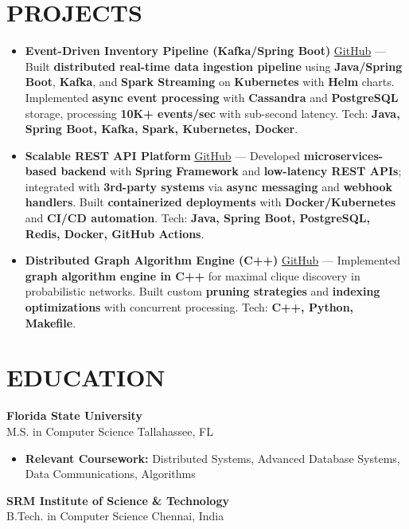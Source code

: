 \documentclass[letterpaper,10pt]{article}
\newcommand{\resumeItem}[1]{\item\small #1}
\newcommand{\resumeSubheading}[4]{
  \vspace{6pt}
  \noindent
  \textbf{#1} \hfill {\footnotesize #2} \\
  [-1pt]
  \noindent
  \small #3 \hfill {\small #4}
  \vspace{3pt}
}
\newcommand{\resumeItemsStart}{\vspace{-2pt}\begin{itemize}}
\newcommand{\resumeItemsEnd}{\end{itemize}\vspace{6pt}}
\begin{document}
\section{\textcolor{metablue}{PROJECTS}}
\vspace{-5pt}
\begin{tcolorbox}[colback=white,colframe=metablue,boxrule=0.8pt,arc=2pt,left=4pt,right=4pt,top=2pt,bottom=2pt]
\begin{itemize}
\resumeItem{\textbf{Event-Driven Inventory Pipeline (Kafka/Spring Boot)} \href{https://github.com/adityasugandhi}{GitHub} --- Built \textbf{distributed real-time data ingestion pipeline} using \textbf{Java/Spring Boot}, \textbf{Kafka}, and \textbf{Spark Streaming} on \textbf{Kubernetes} with \textbf{Helm} charts. Implemented \textbf{async event processing} with \textbf{Cassandra} and \textbf{PostgreSQL} storage, processing \textbf{10K+ events/sec} with sub-second latency. Tech: \textbf{Java, Spring Boot, Kafka, Spark, Kubernetes, Docker}.}
\resumeItem{\textbf{Scalable REST API Platform} \href{https://github.com/adityasugandhi}{GitHub} --- Developed \textbf{microservices-based backend} with \textbf{Spring Framework} and \textbf{low-latency REST APIs}; integrated with \textbf{3rd-party systems} via \textbf{async messaging} and \textbf{webhook handlers}. Built \textbf{containerized deployments} with \textbf{Docker/Kubernetes} and \textbf{CI/CD automation}. Tech: \textbf{Java, Spring Boot, PostgreSQL, Redis, Docker, GitHub Actions}.}
\resumeItem{\textbf{Distributed Graph Algorithm Engine (C++)} \href{https://github.com/adityasugandhi/Improved-Algorithms-in-finding-maximal-and-maximum-clique-in-uncertain-networks}{GitHub} --- Implemented \textbf{graph algorithm engine in C++} for maximal clique discovery in probabilistic networks. Built custom \textbf{pruning strategies} and \textbf{indexing optimizations} with concurrent processing. Tech: \textbf{C++, Python, Makefile}.}
\end{itemize}
\end{tcolorbox}
\vspace{-5pt}


\section{\textcolor{metablue}{EDUCATION}}
\vspace{-10pt}
\resumeSubheading
{Florida State University}{}
{M.S. in Computer Science}{Tallahassee, FL}
\resumeItemsStart
\resumeItem{\textbf{Relevant Coursework:} Distributed Systems, Advanced Database Systems, Data Communications, Algorithms}
\resumeItemsEnd
\vspace{-5pt}
\resumeSubheading
{SRM Institute of Science \& Technology}{}
{B.Tech. in Computer Science}{Chennai, India}
\vspace{-10pt}
\end{document}
